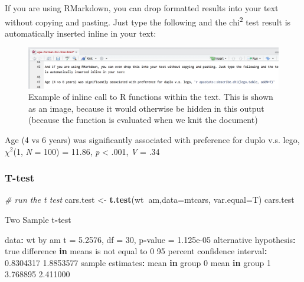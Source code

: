 \documentclass[]{article}
\newenvironment{Shaded}{\begin{snugshade}}{\end{snugshade}}
\newcommand{\CommentTok}[1]{\textcolor[rgb]{0.56,0.35,0.01}{\textit{#1}}}
\newcommand{\ControlFlowTok}[1]{\textcolor[rgb]{0.13,0.29,0.53}{\textbf{#1}}}
\newcommand{\DataTypeTok}[1]{\textcolor[rgb]{0.13,0.29,0.53}{#1}}
\newcommand{\DecValTok}[1]{\textcolor[rgb]{0.00,0.00,0.81}{#1}}
\newcommand{\FloatTok}[1]{\textcolor[rgb]{0.00,0.00,0.81}{#1}}
\newcommand{\KeywordTok}[1]{\textcolor[rgb]{0.13,0.29,0.53}{\textbf{#1}}}
\newcommand{\NormalTok}[1]{#1}
\newcommand{\OperatorTok}[1]{\textcolor[rgb]{0.81,0.36,0.00}{\textbf{#1}}}
\newcommand{\StringTok}[1]{\textcolor[rgb]{0.31,0.60,0.02}{#1}}
\begin{document}
If you are using RMarkdown, you can drop formatted results into your text
without copying and pasting. Just type the following and the chi\textsuperscript{2} test result
is automatically inserted inline in your text:

\begin{figure}
\centering
\includegraphics{media/inline-r-example.png}
\caption{Example of inline call to R functions within the text. This is shown as an image, because it would otherwise be hidden in this output (because the function is evaluated when we knit the document)}
\end{figure}

{Age (4 vs 6 years) was significantly associated with preference for duplo v.s.
lego, \(\chi^2\)(1, \emph{N} = 100) = 11.86, \emph{p} \textless{} .001, \emph{V} = .34}

\hypertarget{t-test}{%
\subsubsection*{T-test}\label{t-test}}

\begin{Shaded}
\begin{Highlighting}[]
\CommentTok{# run the t test}
\NormalTok{cars.test <-}\StringTok{ }\KeywordTok{t.test}\NormalTok{(wt}\OperatorTok{~}\NormalTok{am,}\DataTypeTok{data=}\NormalTok{mtcars, }\DataTypeTok{var.equal=}\NormalTok{T)}
\NormalTok{cars.test}

\NormalTok{    Two Sample t}\OperatorTok{-}\NormalTok{test}

\NormalTok{data}\OperatorTok{:}\StringTok{  }\NormalTok{wt by am}
\NormalTok{t =}\StringTok{ }\FloatTok{5.2576}\NormalTok{, df =}\StringTok{ }\DecValTok{30}\NormalTok{, p}\OperatorTok{-}\NormalTok{value =}\StringTok{ }\FloatTok{1.125e-05}
\NormalTok{alternative hypothesis}\OperatorTok{:}\StringTok{ }\NormalTok{true difference }\ControlFlowTok{in}\NormalTok{ means is not equal to }\DecValTok{0}
\DecValTok{95}\NormalTok{ percent confidence interval}\OperatorTok{:}
\StringTok{ }\FloatTok{0.8304317} \FloatTok{1.8853577}
\NormalTok{sample estimates}\OperatorTok{:}
\NormalTok{mean }\ControlFlowTok{in}\NormalTok{ group }\DecValTok{0}\NormalTok{ mean }\ControlFlowTok{in}\NormalTok{ group }\DecValTok{1} 
       \FloatTok{3.768895}        \FloatTok{2.411000} 
\end{Highlighting}
\end{Shaded}
\end{document}
